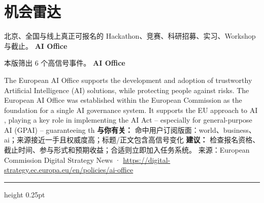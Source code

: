 \documentclass[10.5pt]{ctexart}
\begin{document}
\section*{机会雷达}
{\color{ormuted} 北京、全国与线上真正可报名的 Hackathon、竞赛、科研招募、实习、Workshop 与截止。}
\vspace{2mm}
{\LARGE\bfseries AI Office}\par
\vspace{1mm}
{\color{ormuted} 本版筛出 6 个高信号事件。}
\vspace{3mm}
{\Large\bfseries AI Office}\par
The European AI Office supports the development and adoption of trustworthy Artificial Intelligence (AI) solutions, while protecting people against risks. The European AI Office was established within the European Commission as the foundation for a single AI governance system. It supports the EU approach to AI , playing a key role in implementing the AI Act – especially for general-purpose AI (GPAI) – guaranteeing th
\textbf{与你有关：} 命中用户订阅版面：world、business、ai；来源接近一手且权威度高；标题/正文包含高信号变化
\textbf{建议：} 检查报名资格、截止时间、参与形式和预期收益；合适则立即加入任务系统。
{\footnotesize\color{ormuted} 来源：European Commission Digital Strategy News · \url{https://digital-strategy.ec.europa.eu/en/policies/ai-office}}
\vspace{4mm}
\hrule height 0.25pt
\vspace{3mm}
\end{document}
